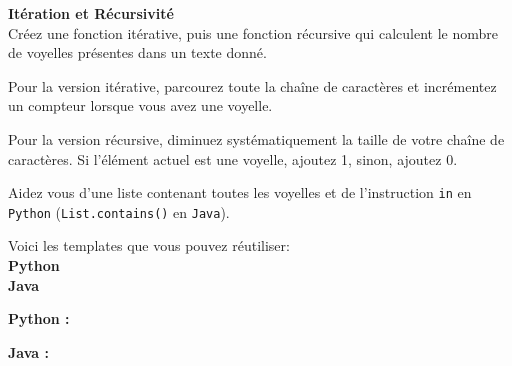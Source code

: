 \begin{Exercice}[15 minutes]\textbf{Itération et Récursivité} \\
Créez une fonction itérative, puis une fonction récursive qui calculent le nombre de voyelles présentes dans un texte donné. \\

\begin{conseil}
   Pour la version itérative, parcourez toute la chaîne de caractères et incrémentez un compteur lorsque vous avez une voyelle.
   
   Pour la version récursive, diminuez systématiquement la taille de votre chaîne de caractères. Si l'élément actuel est une voyelle, ajoutez 1, sinon, ajoutez 0.
   
   Aidez vous d'une liste contenant toutes les voyelles et de l'instruction \lstinline{in} en \lstinline{Python} (\lstinline{List.contains()} en \lstinline{Java}).
\end{conseil}

Voici les templates que vous pouvez réutiliser: \\

\textbf{Python} \\
     

\textbf{Java} \\
    

    
\begin{solution}
\textbf{Python :} \\
    
    
\end{solution}


\begin{solution}   
\textbf{Java :} \\

    
    
    
    
\end{solution}

\end{Exercice}

